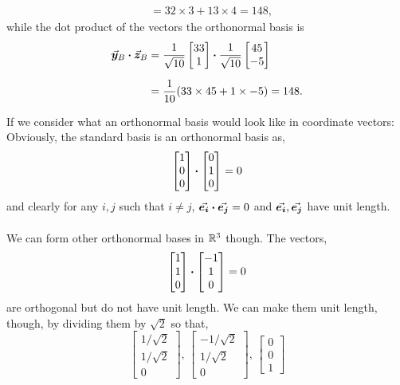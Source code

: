 \documentclass[../MathsNotesBase.tex]{subfiles}
\begin{document}
{\begin{exe}
{\[\begin{aligned}
					&= 32 \times 3 + 13 \times 4 = 148,
				\end{aligned}\]
				while the dot product of the vectors \wrt the orthonormal basis is
				\[\begin{aligned}
					\y_B \dotprod \z_B &= \frac{1}{\sqrt{10}} \begin{bmatrix}33 \\ 1\end{bmatrix} \dotprod \frac{1}{\sqrt{10}} \begin{bmatrix}45 \\ -5\end{bmatrix} \nn
					&= \frac{1}{10} (33 \times 45 + 1 \times -5) = 148.
				\end{aligned}\]
			}
		\end{exe}
		
		\biggerskip
		If we consider what an orthonormal basis would look like in coordinate vectors: Obviously, the standard basis is an orthonormal basis as,
		\[ \begin{bmatrix}1\\0\\0\end{bmatrix} \boldsymbol{\cdot} \begin{bmatrix}0\\1\\0\end{bmatrix} = 0 \]
		and clearly for any ${ i,j }$ such that ${ i \neq j }$, ${ \vec{\bm{e_i}} \boldsymbol{\cdot} \vec{\bm{e_j}} = 0 }$ and ${\vec{\bm{e_i}}, \vec{\bm{e_j}} }$ have unit length.\\\\
		We can form other orthonormal bases in $\mathbb{R}^{3}$ though. The vectors,
		\[ \begin{bmatrix}1\\1\\0\end{bmatrix} \boldsymbol{\cdot} \begin{bmatrix}-1\\1\\0\end{bmatrix} = 0 \]
		are orthogonal but do not have unit length. We can make them unit length, though, by dividing them by $\sqrt{2}$ so that,
		\[ \begin{bmatrix}1/\sqrt{2}\\1/\sqrt{2}\\0\end{bmatrix},\, \begin{bmatrix}-1/\sqrt{2}\\1/\sqrt{2}\\0\end{bmatrix},\, \begin{bmatrix}0\\0\\1\end{bmatrix} \]
}
\end{document}
